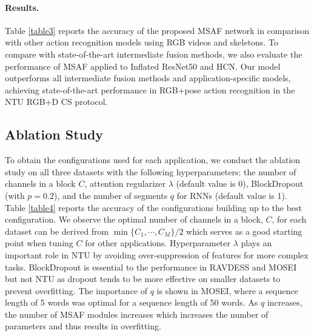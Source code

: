 \documentclass[10pt,twocolumn,letterpaper]{article}
\begin{document}
\paragraph{Results.}
Table \ref{table3} reports the accuracy of the proposed MSAF network in comparison with other action recognition models using RGB videos and skeletons. To compare with state-of-the-art intermediate fusion methods, we also evaluate the performance of MSAF applied to Inflated ResNet50 \cite{Baradel_2018_CVPR} and HCN. Our model outperforms all intermediate fusion methods and application-specific models, achieving state-of-the-art performance in RGB+pose action recognition in the NTU RGB+D CS protocol.

\subsection{Ablation Study}
To obtain the configurations used for each application, we conduct the ablation study on all three datasets with the following hyperparameters: the number of channels in a block $C$, attention regularizer $\lambda$ (default value is 0), BlockDropout (with $p=0.2$), and the number of segments $q$ for RNNs (default value is 1). Table \ref{table4} reports the accuracy of the configurations building up to the best configuration. We observe the optimal number of channels in a block, $C$, for each dataset can be derived from $\min{\{ C_1, \cdots, C_{M}\}}/2$ which serves as a good starting point when tuning $C$ for other applications. Hyperparameter $\lambda$ plays an important role in NTU by avoiding over-suppression of features for more complex tasks. BlockDropout is essential to the performance in RAVDESS and MOSEI but not NTU as dropout tends to be more effective on smaller datasets to prevent overfitting. The importance of $q$ is shown in MOSEI, where a sequence length of 5 words was optimal for a sequence length of 50 words. As $q$ increases, the number of MSAF modules increases which increases the number of parameters and thus results in overfitting.
\end{document}
